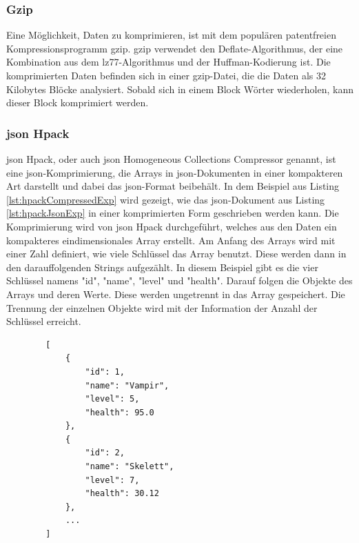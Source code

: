 \subsubsection{Gzip}

Eine Möglichkeit, Daten zu komprimieren, ist mit dem populären patentfreien Kompressionsprogramm \ac{gzip}. \ac{gzip} verwendet den Deflate-Algorithmus, der eine Kombination aus dem \ac{lz77}-Algorithmus und der Huffman-Kodierung ist. Die komprimierten Daten befinden sich in einer \ac{gzip}-Datei, die die Daten als 32 Kilobytes Blöcke analysiert. Sobald sich in einem Block Wörter wiederholen, kann dieser Block komprimiert werden. \cite{gnuGzip}\cite{1414952}\cite{seobilityGzipFunktioniert}

\subsubsection{\ac{json} Hpack}
\ac{json} Hpack, oder auch \ac{json} Homogeneous Collections Compressor genannt, ist eine \ac{json}-Komprimierung, die Arrays in \ac{json}-Dokumenten in einer kompakteren Art darstellt und dabei das \ac{json}-Format beibehält. In dem Beispiel aus Listing \ref{lst:hpackCompressedExp} wird gezeigt, wie das \ac{json}-Dokument aus Listing \ref{lst:hpackJsonExp} in einer komprimierten Form geschrieben werden kann. Die Komprimierung wird von \ac{json} Hpack durchgeführt, welches aus den Daten ein kompakteres eindimensionales Array erstellt. Am Anfang des Arrays wird mit einer Zahl definiert, wie viele Schlüssel das Array benutzt. Diese werden dann in den darauffolgenden Strings aufgezählt. In diesem Beispiel gibt es die vier Schlüssel namens "id", "name", "level" und "health". Darauf folgen die Objekte des Arrays und deren Werte. Diese werden ungetrennt in das Array gespeichert. Die Trennung der einzelnen Objekte wird mit der Information der Anzahl der Schlüssel erreicht.
\cite{webreflectionLastVersion}

\begin{listing}[htp]
    \begin{verbatim} 
        [
            {
                "id": 1,
                "name": "Vampir",
                "level": 5,
                "health": 95.0
            },
            {
                "id": 2,
                "name": "Skelett",
                "level": 7,
                "health": 30.12
            },
            ...
        ]                   
    \end{verbatim}
    \caption{}
    \label{lst:hpackJsonExp}
\end{listing}


